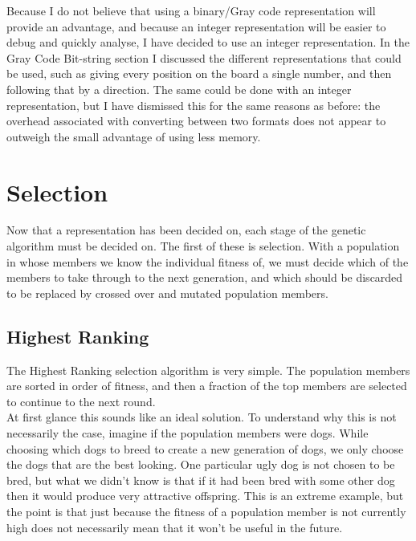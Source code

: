 \documentclass[]{report}
\begin{document}
Because I do not believe that using a binary/Gray code representation will provide an advantage, and because an integer representation will be easier to debug and quickly analyse, I have decided to use an integer representation. In the Gray Code Bit-string section I discussed the different representations that could be used, such as giving every position on the board a single number, and then following that by a direction. The same could be done with an integer representation, but I have dismissed this for the same reasons as before: the overhead associated with converting between two formats does not appear to outweigh the small advantage of using less memory. \\

\section{Selection}
Now that a representation has been decided on, each stage of the genetic algorithm must be decided on. The first of these is selection. With a population in whose members we know the individual fitness of, we must decide which of the members to take through to the next generation, and which should be discarded to be replaced by crossed over and mutated population members.

\subsection{Highest Ranking}

The Highest Ranking selection algorithm is very simple. The population members are sorted in order of fitness, and then a fraction of the top members are selected to continue to the next round. \\

At first glance this sounds like an ideal solution. To understand why this is not necessarily the case, imagine if the population members were dogs. While choosing which dogs to breed to create a new generation of dogs, we only choose the dogs that are the best looking. One particular ugly dog is not chosen to be bred, but what we didn't know is that if it had been bred with some other dog then it would produce very attractive offspring. This is an extreme example, but the point is that just because the fitness of a population member is not currently high does not necessarily mean that it won't be useful in the future.\\
\end{document}
